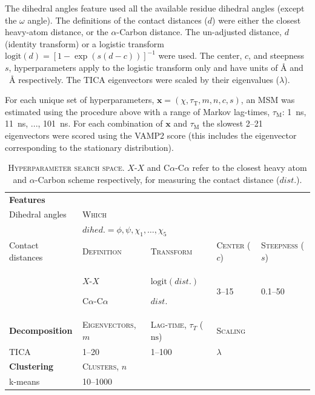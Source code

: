 \documentclass[journal=jacsat,manuscript=article]{achemso}
\newcommand{\nextitem}{\par\hspace*{\labelsep}\textbullet\hspace*{\labelsep}}
\begin{document}
The dihedral angles feature used all the available residue dihedral angles (except the $\omega$ angle). The definitions of the contact distances ($d$) were either the closest heavy-atom distance, or the $\alpha$-Carbon distance. The un-adjusted distance, $d$ (identity transform) or a  logistic transform $\mathrm{logit}(d) = [1-\exp{(s(d-c))}]^{-1}$ were used. The center, $c$, and steepness $s$, hyperparameters apply to the logistic transform only and have units of \si{\angstrom} and \si{\per\angstrom} respectively. The TICA eigenvectors were scaled by their eigenvalues ($\lambda$).

For each unique set of hyperparameters, $\mathbf{x} = (\chi, \tau_{\mathrm{T}}, m, n, c, s)$,  an MSM was estimated using the procedure above with a range of Markov lag-times, $\tau_{\mathrm{M}}$: \SI{1}{\nano\second}, \SI{11}{\nano\second}, ..., \SI{101}{\nano\second}. For each combination of $\mathbf{x}$ and  $\tau_{\mathrm{M}}$ the slowest \numrange{2}{21} eigenvectors were scored using the VAMP2 score (this includes the eigenvector corresponding to the stationary distribution). 
\begin{table}
    \centering
    \begin{tabularx}{\textwidth}{lXXXX}
    \toprule
    \textbf{Features}  & & & &\\
    Dihedral angles & \textsc{Which} & & &\\
    & \multicolumn{2}{l}{$dihed.=\phi, \psi, \chi_{1}, \ldots, \chi_{5}$ } & & \\
    Contact distances &  \textsc{Definition} & \textsc{Transform}& \textsc{Center} ($c$) & \textsc{Steepness} ($s$) \\

     & \nextitem $X$-$X$  \nextitem C$\alpha$-C$\alpha$ & \nextitem $\mathrm{logit}(dist.)$ \nextitem $dist.$ &  \numrange{3}{15} & \numrange{0.1}{50} \\
    \midrule
    \textbf{Decomposition} & \textsc{Eigenvectors}, $m$ & \textsc{Lag-time}, $\tau_{T}$ ($\si{\nano\second}$) & \textsc{Scaling}\\ 
    TICA & \numrange{1}{20} & \numrange{1}{100} & $\lambda$\\
    \midrule
    \textbf{Clustering} & \textsc{Clusters}, $n$ &\\
    k-means & \numrange{10}{1000} & \\
    \bottomrule
    \end{tabularx}
    \caption{\textsc{Hyperparameter search space}. $X$-$X$ and C$\alpha$-C$\alpha$  refer to the closest heavy atom and $\alpha$-Carbon scheme respectively, for measuring the contact distance ($dist.$).  }
    \label{tab:search_space}
\end{table}
\end{document}
